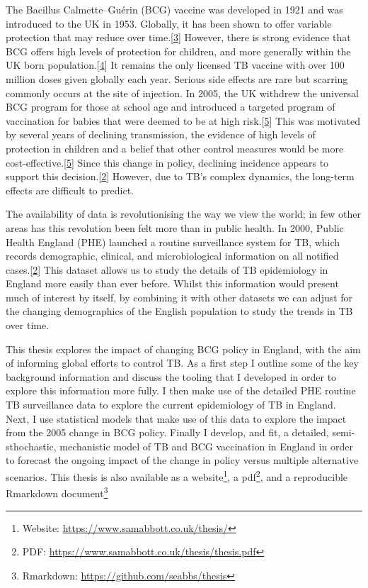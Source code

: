 \documentclass[11pt,twoside]{bristolthesis}
\begin{document}
  The Bacillus Calmette--Guérin (BCG) vaccine was developed in 1921 and was introduced to the UK in 1953. Globally, it has been shown to offer variable protection that may reduce over time.{[}\protect\hyperlink{ref-TheWorldHealthOrganization:2018va}{3}{]} However, there is strong evidence that BCG offers high levels of protection for children, and more generally within the UK born population.{[}\protect\hyperlink{ref-Roy2014}{4}{]} It remains the only licensed TB vaccine with over 100 million doses given globally each year. Serious side effects are rare but scarring commonly occurs at the site of injection. In 2005, the UK withdrew the universal BCG program for those at school age and introduced a targeted program of vaccination for babies that were deemed to be at high risk.{[}\protect\hyperlink{ref-Zwerling2011a}{5}{]} This was motivated by several years of declining transmission, the evidence of high levels of protection in children and a belief that other control measures would be more cost-effective.{[}\protect\hyperlink{ref-Zwerling2011a}{5}{]} Since this change in policy, declining incidence appears to support this decision.{[}\protect\hyperlink{ref-PHE2017}{2}{]} However, due to TB's complex dynamics, the long-term effects are difficult to predict.
  
  The availability of data is revolutionising the way we view the world; in few other areas has this revolution been felt more than in public health. In 2000, Public Health England (PHE) launched a routine surveillance system for TB, which records demographic, clinical, and microbiological information on all notified cases.{[}\protect\hyperlink{ref-PHE2017}{2}{]} This dataset allows us to study the details of TB epidemiology in England more easily than ever before. Whilst this information would present much of interest by itself, by combining it with other datasets we can adjust for the changing demographics of the English population to study the trends in TB over time.
  
  This thesis explores the impact of changing BCG policy in England, with the aim of informing global efforts to control TB. As a first step I outline some of the key background information and discuss the tooling that I developed in order to explore this information more fully. I then make use of the detailed PHE routine TB surveillance data to explore the current epidemiology of TB in England. Next, I use statistical models that make use of this data to explore the impact from the 2005 change in BCG policy. Finally I develop, and fit, a detailed, semi-sthochastic, mechanistic model of TB and BCG vaccination in England in order to forecast the ongoing impact of the change in policy versus multiple alternative scenarios. This thesis is also available as a website\footnote{Website: \url{https://www.samabbott.co.uk/thesis/}}, a pdf\footnote{PDF: \url{https://www.samabbott.co.uk/thesis/thesis.pdf}}, and a reproducible Rmarkdown document\footnote{Rmarkdown: \url{https://github.com/seabbs/thesis}}
  
\end{document}
